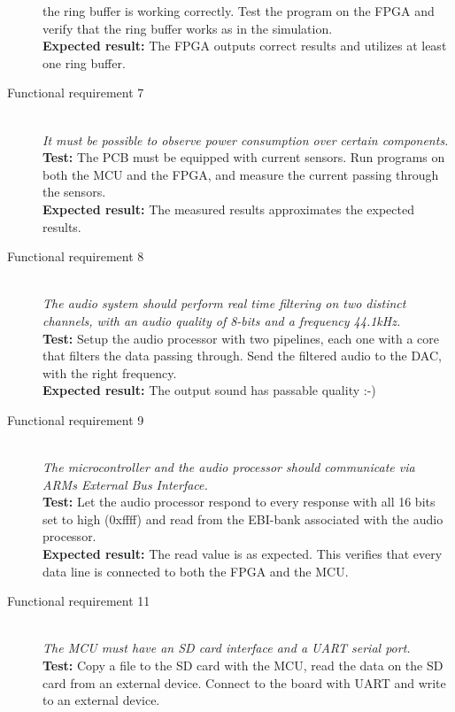 \begin{description}
        the ring buffer is working correctly.
        Test the program on the FPGA and verify that the ring buffer
        works as in the simulation. \\
        \textbf{Expected result:} The FPGA outputs correct results and utilizes at least one ring buffer.
    \item[Functional requirement 7] \hfill \\
        \textit{It must be possible to observe power consumption over certain components.} \\
        \textbf{Test:} The PCB must be equipped with current sensors. Run programs
        on both the MCU and the FPGA, and measure the current passing through the sensors. \\
        \textbf{Expected result:} The measured results approximates the expected results.
    \item[Functional requirement 8] \hfill \\
        \textit{The audio system should perform real time filtering on
        two distinct channels, with an audio quality of 8-bits and a frequency 44.1kHz.} \\
        \textbf{Test:} Setup the audio processor with two pipelines, each one with a core
        that filters the data passing through. Send the filtered audio to the DAC, with the
        right frequency. \\
        \textbf{Expected result:} The output sound has passable quality :-)
    \item[Functional requirement 9] \hfill \\
        \textit{The microcontroller and the audio processor should communicate via ARMs
        External Bus Interface.} \\
        \textbf{Test:} Let the audio processor respond to every response with all 16 bits set
        to high (0xffff) and read from the EBI-bank associated with the audio processor. \\
        \textbf{Expected result:} The read value is as expected. This verifies that every data line
        is connected to both the FPGA and the MCU.
    \item[Functional requirement 11] \hfill \\
        \textit{The MCU must have an SD card interface and a UART serial port.} \\
        \textbf{Test:} Copy a file to the SD card with the MCU, read the data on the SD card
        from an external device. Connect to the board with UART and write to an external device.\\

\end{description}
